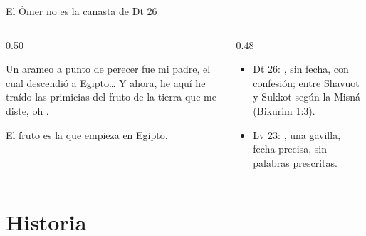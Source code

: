\begin{frame}{El Ómer no es la canasta de Dt 26}
\begin{columns}[t,onlytextwidth]
\begin{column}{0.50\textwidth}
\centering{}
\begin{cita}Un arameo a punto de perecer fue mi padre, el cual descendió a Egipto\ldots{} Y ahora, he aquí he traído las primicias del fruto de la tierra que me diste, oh \SENOR.\end{cita}
\scriptsize\RaggedRight El fruto es la  que empieza en Egipto.
\end{column}
\begin{column}{0.48\textwidth}\small\RaggedRight
\begin{itemize}
\item Dt 26: , sin fecha, con confesión; entre Shavuot y Sukkot según la Misná (Bikurim 1:3).
\item Lv 23: , una gavilla, fecha precisa, sin palabras prescritas.
\end{itemize}
\end{column}
\end{columns}
\end{frame}

\section{Historia}

